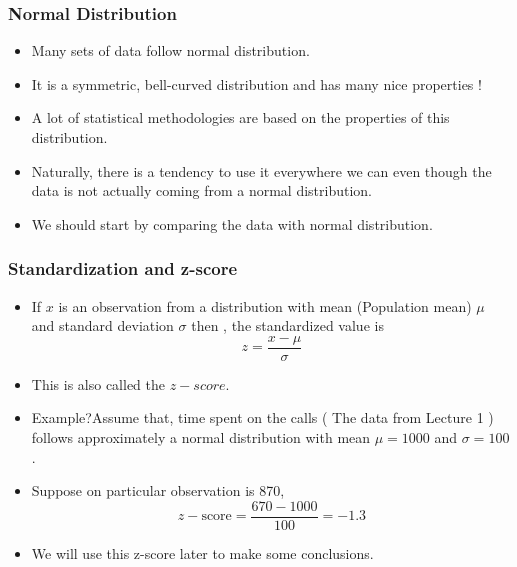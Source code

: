 \documentclass{beamer}\usepackage[]{graphicx}\usepackage[]{color}
\begin{document}
\begin{frame}

\frametitle{Normal Distribution}
\begin{itemize}
\item Many sets of data follow normal distribution. \pause
\item It is a symmetric, bell-curved distribution and has many nice properties ! \pause
\item A lot of statistical methodologies are based on the properties of this distribution. \pause
\item Naturally, there is a tendency to use it everywhere we can even though the data is not actually coming from a normal distribution. \pause
\item We should start by comparing the data with normal distribution. \pause
\end{itemize}
\end{frame}

\begin{frame}

\frametitle{Standardization and z-score }
\begin{itemize}

\item If $x$ is an observation from a distribution with mean (Population mean) $\mu$ and standard deviation $\sigma$ then , the standardized value is 
$$z=\frac{x-\mu}{\sigma}$$ \pause 

\item This is also called the $z-score$. \pause
\item Example?\pause   Assume that, time spent on the calls ( The data from Lecture 1 ) follows approximately a normal distribution with mean $\mu= 1000$ and $\sigma=100$. \pause
\item Suppose on particular observation is 870, $$z-\text{score}= \frac{670-1000}{100}= -1.3$$
\item We will use this z-score later to make some conclusions.
\end{itemize}
\end{frame}
\end{document}
